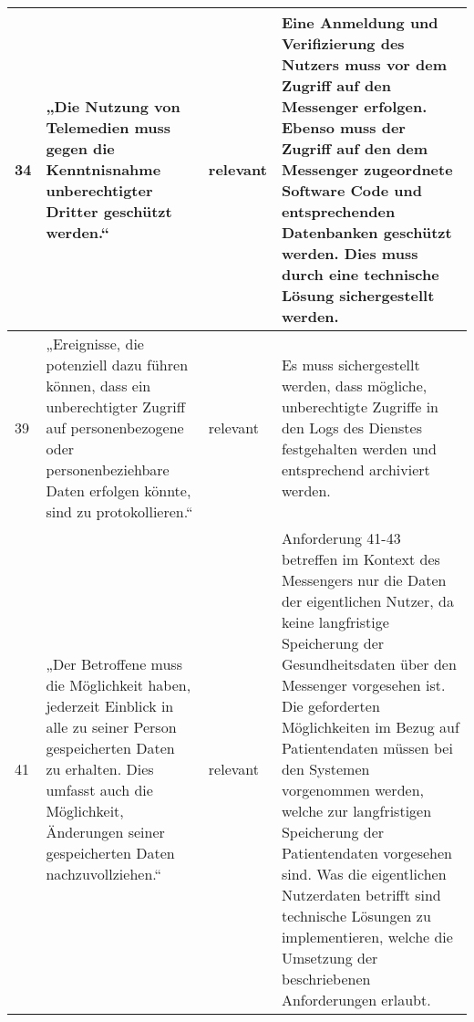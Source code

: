 \begin{longtable}{p{0.6cm}|p{6cm}|p{2cm}|p{6cm}}
    34     & „Die Nutzung von Telemedien muss gegen die Kenntnisnahme unberechtigter Dritter geschützt werden.“                                                                                                                                                                                                   & relevant           & Eine Anmeldung und Verifizierung des Nutzers muss vor dem Zugriff auf den Messenger erfolgen. Ebenso muss der Zugriff auf den dem Messenger zugeordnete Software Code und entsprechenden Datenbanken geschützt werden. Dies muss durch eine technische Lösung sichergestellt werden.                                                                                                                                                                                                                                                                                \\ \hline
    39     & „Ereignisse, die potenziell dazu führen können, dass ein unberechtigter Zugriff auf personenbezogene oder personenbeziehbare Daten erfolgen könnte, sind zu protokollieren.“                                                                                                                         & relevant           & Es muss sichergestellt werden, dass mögliche, unberechtigte Zugriffe in den Logs des Dienstes festgehalten werden und entsprechend archiviert werden.                                                                                                                                                                                                                                                                                                                                                                                                               \\ \hline
    41     & „Der Betroffene muss die Möglichkeit haben, jederzeit Einblick in alle zu seiner Person gespeicherten Daten zu erhalten. Dies umfasst auch die Möglichkeit, Änderungen seiner gespeicherten Daten nachzuvollziehen.“                                                                                 & relevant           & Anforderung 41-43 betreffen im Kontext des Messengers nur die Daten der eigentlichen Nutzer, da keine langfristige Speicherung der Gesundheitsdaten über den Messenger vorgesehen ist. Die geforderten Möglichkeiten im Bezug auf Patientendaten müssen bei den Systemen vorgenommen werden, welche zur langfristigen Speicherung der Patientendaten vorgesehen sind. Was die eigentlichen Nutzerdaten betrifft sind technische Lösungen zu implementieren, welche die Umsetzung der beschriebenen Anforderungen erlaubt. \\ \hline

\end{longtable}
